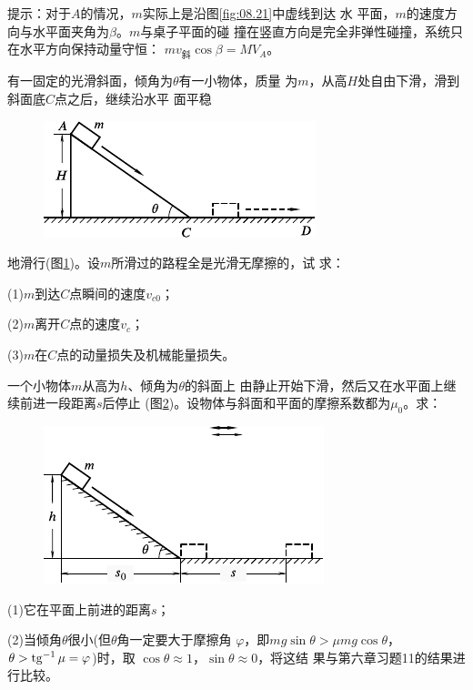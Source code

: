 \begin{exercises}
\lhbrak 提示：对于$ A $的情况，$ m $实际上是沿图\ref{fig:08.21}中虚线到达
水
\clearpage\noindent
平面，$ m $的速度方向与水平面夹角为$ \beta $。$ m $与桌子平面的碰
撞在竖直方向是完全非弹性碰撞，系统只在水平方向保持动量守恒：
$ m v _ \text {斜} \cos \beta = M V _ { A }$。\rhbrak

\exercise 有一固定的光滑斜面，倾角为$ \theta $有一小物体，质量
为$ m $，从高$ H $处自由下滑，滑到斜面底$ C $点之后，继续沿水平
面平稳
\begin{figure}
  \vspace{1.5em}
  \centering
  \includegraphics{figure/fig08.22}
  \caption{}
  \label{fig:08.22}
\end{figure}
地滑行(图\ref{fig:08.22})。设$ m $所滑过的路程全是光滑无摩擦的，试
求：

(1)\;$ m $到达$ C $点瞬间的速度$ v _ { c 0 } $；

(2)\;$ m $离开$ C $点的速度$ v _ { c } $；

(3)\;$ m $在$ C $点的动量损失及机械能量损失。

\exercise 一个小物体$ m $从高为$ h $、倾角为$ \theta $的斜面上
由静止开始下滑，然后又在水平面上继续前进一段距离$ s $后停止
(图\ref{fig:08.23})。设物体与斜面和平面的摩擦系数都为$ \mu _ { 0 } $。求：

\begin{figure}
  \vspace{1.5em}
  \centering
  \includegraphics{figure/fig08.23}
  \caption{}
  \label{fig:08.23}
\end{figure}
(1)它在平面上前进的距离$ s $；

(2)当倾角$ \theta $很小(但$ \theta $角一定要大于摩擦角
$ \varphi $，即$ m g \sin \theta > \mu m g \cos \theta $，
$ \theta > \operatorname{tg} ^ { -1 } \mu = \varphi $)时，取
$ \cos \theta \approx 1 $，$\sin \theta \approx 0 $，将这结
果与第六章习题11的结果进行比较。


\end{exercises}
